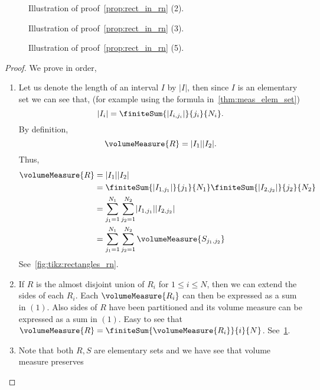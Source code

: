 \begin{figure}
    
    \caption{Illustration of proof~\ref{prop:rect_in_rn} (2).}\label{fig:tikz:rectangles_rn2}
\end{figure}
\begin{figure}
    
    \caption{Illustration of proof~\ref{prop:rect_in_rn} (3).}\label{fig:tikz:rectangles_rn3}
\end{figure}
\begin{figure}
    
    \caption{Illustration of proof~\ref{prop:rect_in_rn} (5).}\label{fig:tikz:rectangles_rn5}
\end{figure}
\begin{proof}
    We prove in order,
    \begin{enumerate}
	\item
	    Let us denote the length of an interval $I$ by $\lvert I \rvert$, then since $I$ is an elementary
	    set we can see that, (for example using the formula in~\ref{thm:meas_elem_set})
	    \[\lvert I_i \rvert = \finiteSum{\lvert I_{i,j_i}\rvert}{j_i}{N_i}.\]
	    By definition,
	    \[\volumeMeasure{R} = \lvert I_1\rvert \lvert I_2 \rvert.\]
	    Thus,
	    \begin{align*}
		\volumeMeasure{R} &= \lvert I_1\rvert \lvert I_2 \rvert \\
		&= \finiteSum{\lvert I_{1,j_1}\rvert}{j_1}{N_1}\finiteSum{\lvert I_{2,j_2}\rvert}{j_2}{N_2}\\
		&= \sum\limits_{j_1 = 1}^{N_1}\sum\limits_{j_2 = 1}^{N_2}\lvert
		I_{1,j_1}\rvert\lvert I_{2,j_2}\rvert\\
		&=\sum\limits_{j_1 = 1}^{N_1}\sum\limits_{j_2 =
		    1}^{N_2}\volumeMeasure{S_{j_1,j_2}}
	    \end{align*}
	    See~\ref{fig:tikz:rectangles_rn}.
	\item
	    If $R$ is the almost disjoint union of $R_i$ for $1\leq i \leq N$, then we can extend the
	    sides of each $R_i$. Each $\volumeMeasure{R_i}$ can then be expressed as a sum in $(1)$.
	    Also sides of $R$ have been partitioned and its volume measure can be expressed as a 
	    sum in $(1)$. Easy to
	    see that $\volumeMeasure{R} = \finiteSum{\volumeMeasure{R_i}}{i}{N}$. 
	    See~\ref{fig:tikz:rectangles_rn2}.
	\item
	    Note that both $R,S$ are elementary sets and we have see that volume measure preserves

\end{enumerate}
\end{proof}
